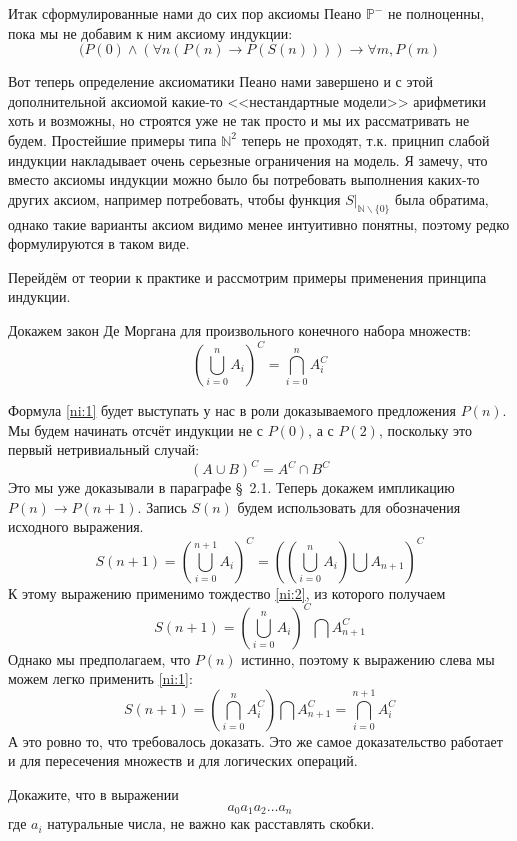 Итак сформулированные нами до сих пор аксиомы Пеано $\mathbb{P}^-$ не полноценны, пока мы не добавим к ним аксиому индукции:
$$(P(0)\land(\forall n (P(n)\to P(S(n)))) \to \forall m, P(m)$$

Вот теперь определение аксиоматики Пеано нами завершено и с этой дополнительной аксиомой какие-то <<нестандартные модели>> арифметики хоть и возможны, но строятся уже не так просто и мы их рассматривать не будем. Простейшие примеры типа $\mathbb{N}^2$ теперь не проходят, т.к. прицнип слабой индукции накладывает очень серьезные ограничения на модель. Я замечу, что вместо аксиомы индукции можно было бы потребовать выполнения каких-то других аксиом, например потребовать, чтобы функция $S|_{\mathbb{N}\backslash\{0\}}$ была обратима, однако такие варианты аксиом видимо менее интуитивно понятны, поэтому редко формулируются в таком виде.

Перейдём от теории к практике и рассмотрим примеры применения принципа индукции.

\begin{example}
Докажем закон Де Моргана для произвольного конечного набора множеств:
\begin{equation}\label{ni:1}
\left(\bigcup_{i=0}^n A_i\right)^C = \bigcap_{i=0}^n A_i^C
\end{equation}
\end{example}

Формула \eqref{ni:1} будет выступать у нас в роли доказываемого предложения $P(n)$. Мы будем начинать отсчёт индукции не с $P(0)$, а с $P(2)$, поскольку это первый нетривиальный случай:
\begin{equation}\label{ni:2}
(A\cup B)^C = A^C \cap B^C
\end{equation}
Это мы уже доказывали в параграфе \S~2.1. Теперь докажем импликацию $P(n)\to P(n + 1)$. Запись $S(n)$ будем использовать для обозначения исходного выражения.
$$S(n+1) = \left( \bigcup_{i=0}^{n+1} A_i \right)^C = \left( \left( \bigcup_{i=0}^n A_i\right) \bigcup A_{n+1}\right)^C$$
К этому выражению применимо тождество \eqref{ni:2}, из которого получаем
$$S(n+1) = \left( \bigcup_{i=0}^n A_i\right)^C \bigcap A_{n+1}^C$$
Однако мы предполагаем, что $P(n)$ истинно, поэтому к выражению слева мы можем легко применить \eqref{ni:1}:
$$S(n+1) = \left(\bigcap_{i=0}^n A_i^C\right) \bigcap A_{n+1}^C = \bigcap_{i=0}^{n+1} A_i^C$$
А это ровно то, что требовалось доказать. Это же самое доказательство работает и для пересечения множеств и для логических операций.

\begin{example}\label{ex:naturals_assoc}
Докажите, что в выражении
$$a_0 a_1 a_2 \ldots a_n$$
где $a_i$ натуральные числа, не важно как расставлять скобки.
\end{example}

